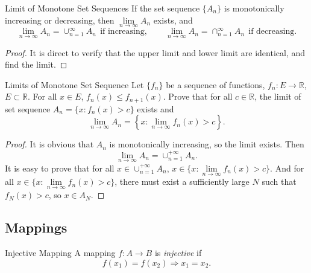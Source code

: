 \begin{proposition}{Limit of Monotone Set Sequences}{}
  If the set sequence $\{A_n\}$ is monotonically increasing or decreasing,
  then $\lim \limits _{n \rightarrow \infty} A_n$ exists, and
  \begin{equation}
    \lim \limits _{n \rightarrow \infty} A_n = \cup _{n = 1}^{\infty} A_n ~~  \text{if increasing},
    \quad \quad
    \lim \limits _{n \rightarrow \infty} A_n = \cap _{n = 1}^{\infty} A_n ~~  \text{if decreasing}.
  \end{equation}
\end{proposition}

\begin{proof}
  It is direct to verify that the upper limit and lower limit are identical,
  and find the limit.
\end{proof}

\begin{example}{Limits of Monotone Set Sequence}{}
  Let $\{f_n\}$ be a sequence of functions, $f_n : E \rightarrow \mathbb{R}$, $E \subset \mathbb{R}$.
  For all $x \in E$, $f_n(x) \leq f_{n+1}(x)$. Prove that for all $c \in \mathbb{R}$,
  the limit of set sequence $A_n = \{x: f_n(x) > c\}$ exists and 
  \begin{equation}
    \lim \limits _{n \rightarrow \infty} A_n = \left\{ x:\lim \limits _{n \rightarrow \infty} f_n(x) > c \right\}.
  \end{equation}
\end{example}

\begin{proof}
  It is obvious that $A_n$ is monotonically increasing, so the limit exists.
  Then
  \begin{equation}
    \lim \limits _{n \rightarrow \infty} A_n = \cup _{n = 1}^{+\infty}A_n.
  \end{equation}
  It is easy to prove that for all $x \in \cup _{n = 1}^{+\infty}A_n$,
  $x \in \{x: \lim \limits _{n \rightarrow \infty} f_n(x) > c\}$.
  And for all $x \in \{x: \lim \limits _{n \rightarrow \infty} f_n(x) > c\}$,
  there must exist a sufficiently large $N$ such that $f_N(x) > c$,
  so $x \in A_N$.
\end{proof}

\subsection{Mappings}

\begin{definition}{Injective Mapping}{}
  A mapping $f:A \rightarrow B$ is \emph{injective} if
  \begin{equation}
    f(x_1) = f(x_2) \Rightarrow x_1 = x_2.
  \end{equation}
\end{definition}

